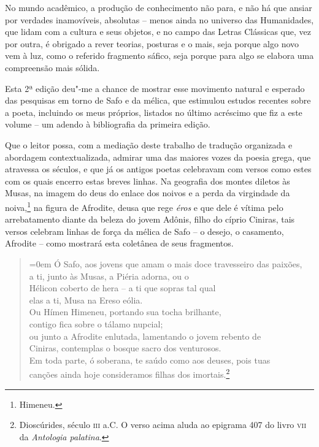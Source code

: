 No mundo acadêmico, a produção de conhecimento não para, e não há que
ansiar por verdades inamovíveis, absolutas -- menos ainda no universo
das Humanidades, que lidam com a cultura e seus objetos,
e no campo das Letras Clássicas que, vez por outra, é obrigado a rever
teorias, posturas e o mais, seja porque algo novo vem à luz, como o 
referido fragmento sáfico, seja porque para algo se elabora uma compreensão mais
sólida.

Esta 2ª edição deu"-me a chance de mostrar esse movimento natural e
esperado das pesquisas em torno de Safo e da mélica, que estimulou
estudos recentes sobre a poeta, incluindo os meus próprios, listados no
último acréscimo que fiz a este volume -- um adendo à bibliografia
da primeira edição.

Que o leitor possa, com a mediação deste trabalho de tradução organizada
e abordagem contextualizada, admirar uma das maiores vozes da poesia grega, que
atravessa os séculos, e que já os antigos poetas celebravam com versos
como estes com os quais encerro estas breves linhas.
Na geografia dos montes diletos às Musas, na imagem do deus do enlace dos noivos 
e a perda da virgindade da noiva,\footnote{Himeneu.} na figura de Afrodite, deusa 
que rege \textit{éros} e que dele é vítima pelo arrebatamento diante 
da beleza do jovem Adônis, filho do cíprio Ciniras, tais versos celebram 
linhas de força da mélica de Safo -- o desejo, o casamento, Afrodite -- como 
mostrará esta coletânea de seus fragmentos.

\begin{quote}\parindent=0em
Ó Safo, aos jovens que amam o mais doce travesseiro das paixões,\\
a ti, junto às Musas, a Piéria adorna, ou o\\
Hélicon coberto de hera -- a ti que sopras tal qual\\
elas a ti, Musa na Ereso eólia.\\
Ou Hímen Himeneu, portando sua tocha brilhante,\\
contigo fica sobre o tálamo nupcial;\\
ou junto a Afrodite enlutada, lamentando o jovem rebento de\\
Ciniras, contemplas o bosque sacro dos venturosos.\\
Em toda parte, ó soberana, te saúdo como aos deuses, pois tuas\\
canções ainda hoje consideramos filhas dos imortais.\footnote{Dioscúrides, século \textsc{iii} a.C. O verso acima aluda ao epigrama 407 do livro \textsc{vii} da \textit{Antologia palatina}.}
\end{quote}


